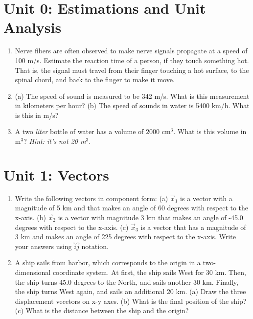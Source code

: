 \documentclass[10pt]{article}
\begin{document}
\section{Unit 0: Estimations and Unit Analysis}

\begin{enumerate}
\item Nerve fibers are often observed to make nerve signals propagate at a speed of 100 m/s.  Estimate the reaction time of a person, if they touch something hot.  That is, the signal must travel from their finger touching a hot surface, to the spinal chord, and back to the finger to make it move. \\ \vspace{1.0cm}
\item (a) The speed of sound is measured to be 342 m/s. What is this measurement in kilometers per hour?  (b) The speed of sounds in water is 5400 km/h.  What is this in m/s? \\ \vspace{0.5cm}
\item A two \textit{liter} bottle of water has a volume of $2000$ cm$^3$.  What is this volume in m$^3$?  \textit{Hint: it's not 20 m$^3$.}\\ \vspace{0.5cm}
\end{enumerate}

\section{Unit 1: Vectors}

\begin{enumerate}
\item Write the following vectors in component form: (a) $\vec{x}_1$ is a vector with a magnitude of 5 km and that makes an angle of 60 degrees with respect to the x-axis. (b) $\vec{x}_2$ is a vector with magnitude 3 km that makes an angle of -45.0 degrees with respect to the x-axis. (c) $\vec{x}_3$ is a vector that has a magnitude of 3 km and makes an angle of 225 degrees with respect to the x-axis.  Write your answers using $\hat{i} \hat{j}$ notation.  \\ \vspace{3cm}
\item A ship sails from harbor, which corresponds to the origin in a two-dimensional coordinate system.  At first, the ship sails West for 30 km.  Then, the ship turns 45.0 degrees to the North, and sails another 30 km.  Finally, the ship turns West again, and sails an additional 20 km.  (a) Draw the three displacement vecetors on x-y axes.  (b) What is the final position of the ship?  (c) What is the distance between the ship and the origin? \\ \vspace{3cm}
\end{enumerate}
\end{document}
